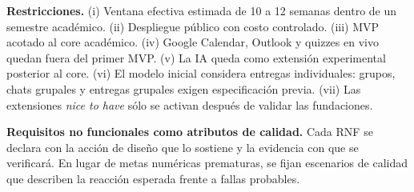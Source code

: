 \documentclass[letterpaper,10pt]{article}
\begin{document}
\textbf{Restricciones.} (i) Ventana efectiva estimada de 10 a 12 semanas dentro de un semestre académico. (ii) Despliegue público con costo controlado. (iii) MVP acotado al core académico. (iv) Google Calendar, Outlook y quizzes en vivo quedan fuera del primer MVP. (v) La IA queda como extensión experimental posterior al core. (vi) El modelo inicial considera entregas individuales: grupos, chats grupales y entregas grupales exigen especificación previa. (vii) Las extensiones \emph{nice to have} sólo se activan después de validar las fundaciones.

\textbf{Requisitos no funcionales como atributos de calidad.} Cada RNF se declara con la acción de diseño que lo sostiene y la evidencia con que se verificará. En lugar de metas numéricas prematuras, se fijan escenarios de calidad que describen la reacción esperada frente a fallas probables.
\end{document}
